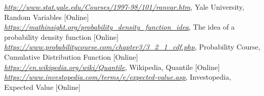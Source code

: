 \begin{thebibliography}{9}
\href{http://www.stat.yale.edu/Courses/1997-98/101/ranvar.htm}{\emph{http://www.stat.yale.edu/Courses/1997-98/101/ranvar.htm}}, Yale University, Random Variables [Online]
 \href{https://mathinsight.org/probability_density_function_idea}{\emph{https://mathinsight.org/probability\_density\_function\_idea}}, The idea of a probability density function [Online]
\href{https://www.probabilitycourse.com/chapter3/3_2_1_cdf.php}{\emph{https://www.probabilitycourse.com/chapter3/3\_2\_1\_cdf.php}}, Probability Course, Cumulative Distribution Function [Online]
\href{https://en.wikipedia.org/wiki/Quantile}{\emph{https://en.wikipedia.org/wiki/Quantile}}, Wikipedia, Quantile [Online]
\href{https://www.investopedia.com/terms/e/expected-value.asp}{\emph{https://www.investopedia.com/terms/e/expected-value.asp}}, Investopedia, Expected Value [Online]
\end{thebibliography}